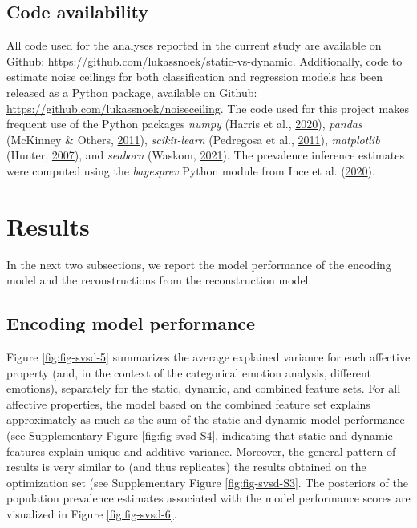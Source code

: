 \documentclass[12pt,american,a4paper,oneside,]{memoir} %
\begin{document}
\hypertarget{svsd-code}{%
\subsection{Code availability}\label{svsd-code}}

All code used for the analyses reported in the current study are available on Github: \url{https://github.com/lukassnoek/static-vs-dynamic}. Additionally, code to estimate noise ceilings for both classification and regression models has been released as a Python package, available on Github: \url{https://github.com/lukassnoek/noiseceiling}. The code used for this project makes frequent use of the Python packages \emph{numpy} (Harris et al., \protect\hyperlink{ref-Harris2020-en}{2020}), \emph{pandas} (McKinney \& Others, \protect\hyperlink{ref-McKinney2011-kl}{2011}), \emph{scikit-learn} (Pedregosa et al., \protect\hyperlink{ref-pedregosa2011scikit}{2011}), \emph{matplotlib} (Hunter, \protect\hyperlink{ref-Hunter2007-at}{2007}), and \emph{seaborn} (Waskom, \protect\hyperlink{ref-waskom2021seaborn}{2021}). The prevalence inference estimates were computed using the \emph{bayesprev} Python module from Ince et al. (\protect\hyperlink{ref-Ince2020-mr}{2020}).

\hypertarget{svsd-results}{%
\section{Results}\label{svsd-results}}

In the next two subsections, we report the model performance of the encoding model and the reconstructions from the reconstruction model.

\hypertarget{encoding-model-performance}{%
\subsection{Encoding model performance}\label{encoding-model-performance}}

Figure \ref{fig:fig-svsd-5} summarizes the average explained variance for each affective property (and, in the context of the categorical emotion analysis, different emotions), separately for the static, dynamic, and combined feature sets. For all affective properties, the model based on the combined feature set explains approximately as much as the sum of the static and dynamic model performance (see Supplementary Figure \ref{fig:fig-svsd-S4}, indicating that static and dynamic features explain unique and additive variance. Moreover, the general pattern of results is very similar to (and thus replicates) the results obtained on the optimization set (see Supplementary Figure \ref{fig:fig-svsd-S3}. The posteriors of the population prevalence estimates associated with the model performance scores are visualized in Figure \ref{fig:fig-svsd-6}.
\end{document}
